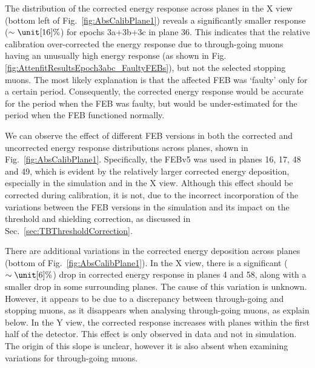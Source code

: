 The distribution of the corrected energy response across planes in the X view (bottom left of Fig.~\ref{fig:AbsCalibPlane1}) reveals a significantly smaller response ($\sim\unit[16]{\%}$) for epochs 3a+3b+3c in plane 36. This indicates that the relative calibration over-corrected the energy response due to through-going muons having an unusually high energy response (as shown in Fig. \ref{fig:AttenfitResultsEpoch3abc_FaultyFEBs}), but not the selected stopping muons. The most likely explanation is that the affected \gls{FEB} was `faulty' only for a certain period. Consequently, the corrected energy response would be accurate for the period when the \gls{FEB} was faulty, but would be under-estimated for the period when the \gls{FEB} functioned normally.

We can observe the effect of different \gls{FEB} versions in both the corrected and uncorrected energy response distributions across planes, shown in Fig.~\ref{fig:AbsCalibPlane1}. Specifically, the \gls{FEB}v5 was used in planes 16, 17, 48 and 49, which is evident by the relatively larger corrected energy deposition, especially in the simulation and in the X view. Although this effect should be corrected during calibration, it is not, due to the incorrect incorporation of the variations between the \gls{FEB} versions in the simulation and its impact on the threshold and shielding correction, as discussed in Sec.~\ref{sec:TBThresholdCorrection}.

There are additional variations in the corrected energy deposition across planes (bottom of Fig.~\ref{fig:AbsCalibPlane1}). In the X view, there is a significant ($\sim\unit[6]{\%}$) drop in corrected energy response in planes 4 and 58, along with a smaller drop in some surrounding planes. The cause of this variation is unknown. However, it appears to be due to a discrepancy between through-going and stopping muons, as it disappears when analysing through-going muons, as explain below. In the Y view, the corrected response increases with planes  within the first half of the detector. This effect is only observed in data and not in simulation. The origin of this slope is unclear, however it is also absent when examining variations for through-going muons.

